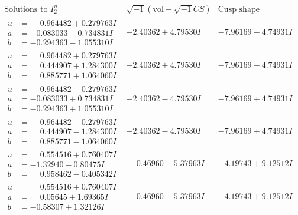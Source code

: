 \documentclass[1p]{elsarticle_modified}
\theoremstyle{definition}
\newcommand{\I}{\sqrt{-1}}
\begin{document}
$$\begin{array}{c|c|c}  
\text{Solutions to }I^u_{2}& \I (\text{vol} + \sqrt{-1}CS) & \text{Cusp shape}\\
 \hline 
\begin{aligned}
u &= \phantom{-}0.964482 + 0.279763 I \\
a &= -0.083033 - 0.734831 I \\
b &= -0.294363 - 1.055310 I\end{aligned}
 & -2.40362 + 4.79530 I & -7.96169 - 4.74931 I \\ \hline\begin{aligned}
u &= \phantom{-}0.964482 + 0.279763 I \\
a &= \phantom{-}0.444907 + 1.284300 I \\
b &= \phantom{-}0.885771 + 1.064060 I\end{aligned}
 & -2.40362 + 4.79530 I & -7.96169 - 4.74931 I \\ \hline\begin{aligned}
u &= \phantom{-}0.964482 - 0.279763 I \\
a &= -0.083033 + 0.734831 I \\
b &= -0.294363 + 1.055310 I\end{aligned}
 & -2.40362 - 4.79530 I & -7.96169 + 4.74931 I \\ \hline\begin{aligned}
u &= \phantom{-}0.964482 - 0.279763 I \\
a &= \phantom{-}0.444907 - 1.284300 I \\
b &= \phantom{-}0.885771 - 1.064060 I\end{aligned}
 & -2.40362 - 4.79530 I & -7.96169 + 4.74931 I \\ \hline\begin{aligned}
u &= \phantom{-}0.554516 + 0.760407 I \\
a &= -1.32940 - 0.80475 I \\
b &= \phantom{-}0.958462 - 0.405342 I\end{aligned}
 & \phantom{-}0.46960 - 5.37963 I & -4.19743 + 9.12512 I \\ \hline\begin{aligned}
u &= \phantom{-}0.554516 + 0.760407 I \\
a &= \phantom{-}0.05645 + 1.69365 I \\
b &= -0.58307 + 1.32126 I\end{aligned}
 & \phantom{-}0.46960 - 5.37963 I & -4.19743 + 9.12512 I \\ \hline\begin{aligned}

\end{aligned}
\end{array}$$
\end{document}
